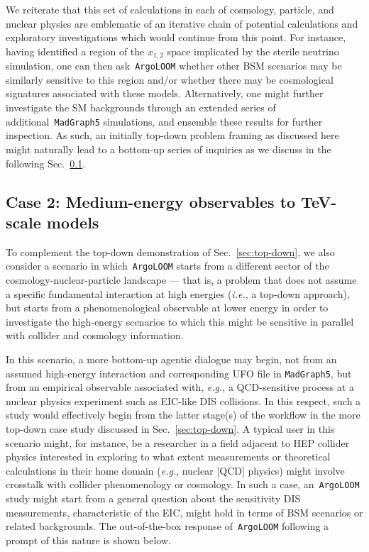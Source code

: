 \documentclass[final,3p,times,sort,compress]{elsarticle}
\newcommand{\AL}{\texttt{ArgoLOOM}\xspace}
\newcommand{\MG}{\texttt{MadGraph5}\xspace}
\begin{document}
We reiterate that this set of calculations in each of cosmology, particle, and nuclear physics are emblematic of an iterative chain of potential calculations and exploratory investigations which would continue from this point. For instance, having identified a region of the $x_{1,2}$ space implicated by the sterile neutrino simulation, one can then ask~\AL whether other BSM scenarios may be similarly sensitive to this region and/or whether there may be cosmological signatures associated with these models. Alternatively, one might further investigate the SM backgrounds through an extended series of additional~\MG simulations, and ensemble these results for further inspection.
%
As such, an initially top-down problem framing as discussed here might naturally lead to a bottom-up series of inquiries as we discuss in the following Sec.~\ref{sec:bottom-up}.



\subsection{Case 2: Medium-energy observables to TeV-scale models}
\label{sec:bottom-up}
%
To complement the top-down demonstration of Sec.~\ref{sec:top-down}, we also consider
a scenario in which~\AL starts from a different sector of the cosmology-nuclear-particle
landscape --- that is, a problem that does not assume a specific fundamental interaction
at high energies ({\it i.e.}, a top-down approach), but starts from a phenomenological
observable at lower energy in order to investigate the high-energy scenarios to which
this might be sensitive in parallel with collider and cosmology information.

In this scenario, a more bottom-up agentic dialogue may begin, not from an assumed high-energy interaction
and corresponding UFO file in \MG, but from an empirical observable associated with, {\it
e.g.}, a QCD-sensitive process at a nuclear physics experiment such as EIC-like DIS
collisions.
%
%
In this respect, such a study would effectively begin from the latter stage(s) of the workflow in the more top-down case study discussed in Sec.~\ref{sec:top-down}.
%
A typical user in this scenario might, for instance, be a researcher in a field adjacent to HEP collider physics interested in exploring to what extent measurements or theoretical calculations in their home domain ({\it e.g.}, nuclear [QCD] physics) might involve crosstalk with collider phenomenology or cosmology.
%
In such a case, an~\AL study might start from a general question about the sensitivity DIS measurements, characteristic of the EIC, might hold in terms of BSM scenarios or related backgrounds.
%
The out-of-the-box response of~\AL following a prompt of this nature is shown below.
\end{document}
